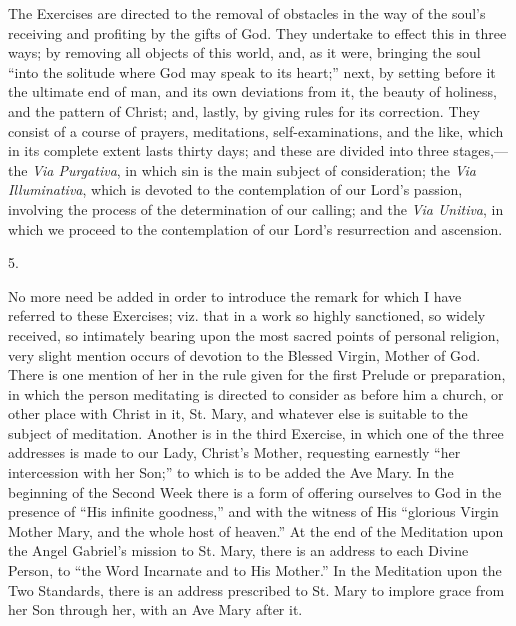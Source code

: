 The Exercises are directed to the removal of obstacles in the way
of the soul's receiving and profiting by the gifts of God. They
undertake to effect this in three ways; by removing all objects of
this world, and, as it were, bringing the soul ``into the solitude
where God may speak to its heart;'' next, by setting before it the
ultimate end of man, and its own deviations from it, the beauty of
holiness, and the pattern of Christ; and, lastly, by giving rules for
its correction. They consist of a course of prayers, meditations,
self-examinations, and the like, which in its complete extent lasts
thirty days; and these are divided into three stages,—the \emph{Via
Purgativa}, in which sin is the main subject of consideration; the \emph{Via
Illuminativa}, which is devoted to the contemplation of our Lord's
passion, involving the process of the determination of our calling;
and the \emph{Via Unitiva}, in which we proceed to the contemplation
of our Lord's resurrection and ascension.

5.

No more need be added in order to introduce the remark for which I
have referred to these Exercises; viz. that in a work so highly
sanctioned, so widely received, so intimately bearing upon the most
sacred points of personal religion, very slight mention occurs of
devotion to the Blessed Virgin, Mother of God. There is one mention of
her in the rule given for the first Prelude or preparation, in which
the person meditating is directed to consider as before him a church,
or other place with Christ in it, St. Mary, and whatever else is
suitable to the subject of meditation. Another is in the third
Exercise, in which one of the three addresses is made to our Lady,
Christ's Mother, requesting earnestly ``her intercession with her
Son;'' to which is to be added the Ave Mary. In the beginning of
the Second Week there is a form of offering ourselves to God in the
presence of ``His infinite goodness,'' and with the witness of
His ``glorious Virgin Mother Mary, and the whole host of
heaven.'' At the end of the Meditation upon the Angel Gabriel's
mission to St. Mary, there is an address to each Divine Person, to
``the Word Incarnate and to His Mother.'' In the Meditation
upon the Two Standards, there is an address prescribed to St. Mary to
implore grace from her Son through her, with an Ave Mary after it.


